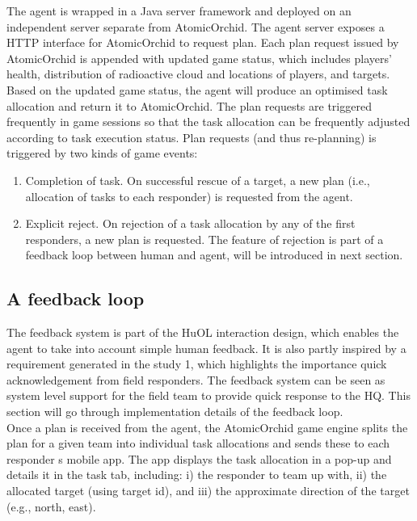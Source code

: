 The agent is wrapped in a Java server framework and deployed on an independent server separate from AtomicOrchid. The agent server exposes a HTTP interface for AtomicOrchid to request plan. Each plan request issued by AtomicOrchid is appended with  updated game status, which includes players' health, distribution of radioactive cloud and locations of players, and targets. Based on the updated game status, the agent will produce an optimised task allocation and return it to AtomicOrchid. The plan requests are triggered frequently in game sessions so that the task allocation can be frequently adjusted according to task execution status. Plan requests (and thus re-planning) is triggered by two kinds of game events:\\


\begin{enumerate}
\item Completion of task. On successful rescue of a target, a new plan (i.e., allocation of tasks to each responder) is requested from the agent.\\

\item Explicit reject. On rejection of a task allocation by any of the first responders, a new plan is requested.  The feature of rejection is part of a feedback loop between human and agent, will be introduced in next section.\\

\end{enumerate}


\subsection{A feedback loop}
The feedback system is part of the HuOL interaction design, which enables the agent to take into account simple human feedback. It is also partly inspired by a requirement generated in the study 1, which highlights the importance quick acknowledgement from field responders. The feedback system can be seen as system level support for the field team to provide quick response to the HQ. This section will go through implementation details of the feedback loop.\\

Once a plan is received from the agent, the AtomicOrchid game engine splits the plan for a given team into individual task allocations and sends these to each responder s mobile app. The app displays the task allocation in a pop-up and details it in the task tab, including: i) the responder to team up with, ii) the allocated target (using target id), and iii) the approximate direction of the target (e.g., north, east).\\


